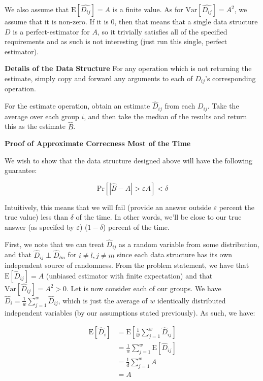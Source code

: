 \documentclass[12pt]{exam}
\newcommand*{\prob}[1]{\text{Pr} \left[ #1 \right]}
\newcommand*{\ex}[1]{\text{E} \left[ #1 \right]}
\newcommand*{\var}[1]{\text{Var} \left[ #1 \right]}
\newcommand*{\eps}{\varepsilon}  %
\begin{document}
\begin{questions}
\begin{solution}
We also assume that $\ex{\hat{D_{ij}}} = A$ is a finite value. As for $\var{\hat{D_{ij}}} = A^2$, we assume that it is non-zero. If it is $0$, then that means that a single data structure $D$ is a perfect-estimator for $A$, so it trivially satisfies all of the specified requirements and as such is not interesting (just run this single, perfect estimator).


\textbf{Details of the Data Structure}
For any operation which is not returning the estimate, simply copy and forward any arguments to each of $D_{ij}$'s corresponding operation.

For the estimate operation, obtain an estimate $\hat{D}_{ij}$ from each $D_{ij}$. Take the average over each group $i$, and then take the median of the results and return this as the estimate $\hat{B}$.


\textbf{Proof of Approximate Correcness Most of the Time}

We wish to show that the data structure designed above will have the following guarantee:

$$
  \prob{|\hat{B} - A| > \eps A} < \delta
$$

Intuitively, this means that we will fail (provide an answer outside $\eps$ percent the true value) less than $\delta$ of the time. In other words, we'll be close to our true answer (as specifed by $\eps$) ($1 - \delta$) percent of the time.


First, we note that we can treat $\hat{D}_{ij}$ as a random variable from some distribution, and that $\hat{D}_{ij} \perp \hat{D}_{lm}$ for $i \neq l, j \neq m$ since each data structure has its own independent source of randomness. From the problem statement, we have that $\ex{\hat{D}_{ij}} = A$ (unbiased estimator with finite expectation) and that $\var{\hat{D}_{ij}} = A^2 > 0$. Let is now consider each of our groups. We have $\hat{D}_i = \frac{1}{w} \sum_{j=1}^w \hat{D}_{ij}$, which is just the average of $w$ identically distributed independent variables (by our assumptions stated previously). As such, we have:

\begin{align*}
  \ex{\hat{D}_i} &= \ex{\frac{1}{w} \sum_{j=1}^w \hat{D}_{ij}} \tag{Definition} \\
  &= \frac{1}{w} \sum_{j=1}^w \ex{\hat{D}_{ij}} \tag{Linearity of Expectation} \\
  &= \frac{1}{d} \sum_{j=1}^w A \tag{Previous results} \\
  &= A
\end{align*}


\end{solution}
\end{questions}
\end{document}

